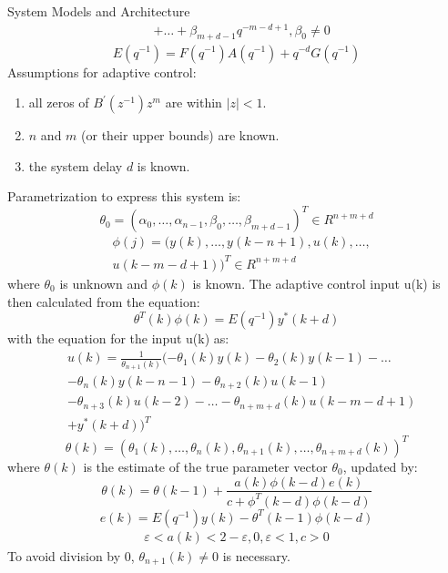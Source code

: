 \begin{section}{System Models and Architecture}
\begin{align}
	& + \dots +\beta_{m+d-1}q^{-m-d+1}, \beta_0\neq0
	\end{align}
	\begin{equation}
	E(q^{-1})=F(q^{-1})A(q^{-1})+q^{-d}G(q^{-1})
	\end{equation}
	Assumptions for adaptive control: 
	\begin{enumerate}
	\item all zeros of $B^{'}(z^{-1})z^m$ are within $|z|<1$. 
	\item $n$ and $m$ (or their upper bounds) are known. 
	\item the system delay $d$ is known.
	\end{enumerate}
Parametrization to express this system is:
	\begin{equation}
	\theta_0=(\alpha_0, \dots ,\alpha_{n-1},\beta_0, \dots ,\beta_{m+d-1})^T \in R^{n+m+d}
	\end{equation}
	\begin{align}
	& \phi(j)=(y(k), \dots ,y(k-n+1),u(k), \dots , \nonumber \\
	& u(k-m-d+1))^T \in R^{n+m+d}
	\end{align}
where $\theta_0$ is unknown and $\phi(k)$ is known.
	The adaptive control input u(k) is then calculated from the equation:
	\begin{equation}
	\theta^T(k)\phi(k)=E(q^{-1})y^{*}(k+d)
	\end{equation}
with the equation for the input u(k) as:
	\begin{align}
	& u(k)=\frac{1}{\theta_{n+1}(k)}(-\theta_1(k)y(k)-\theta_2(k)y(k-1)- \dots  \nonumber \\
	& -\theta_n(k)y(k-n-1)-\theta_{n+2}(k)u(k-1) \nonumber \\
	& -\theta_{n+3}(k)u(k-2)- \dots - \theta_{n+m+d}(k)u(k-m-d+1) \nonumber \\
	& +y^{*}(k+d))^T
	\end{align}
	\begin{equation}
	\theta(k)=(\theta_1(k), \dots ,\theta_n(k),\theta_{n+1}(k), \dots ,\theta_{n+m+d}(k))^T
	\end{equation}
where $\theta(k)$ is the estimate of the true parameter vector $\theta_0$, updated by:
	\begin{equation}
	\theta(k)=\theta(k-1)+\frac{a(k)\phi(k-d)e(k)}{c+\phi^T(k-d)\phi(k-d)}
	\end{equation}
	\begin{equation}
	e(k)=E(q^{-1})y(k)-\theta^T(k-1)\phi(k-d)
	\end{equation}
	\begin{align*}
	\varepsilon<a(k)<2-\varepsilon, 0,\varepsilon<1, c>0
	\end{align*}
To avoid division by 0, $\theta_{n+1}(k)\neq0$ is necessary.



\end{section}
